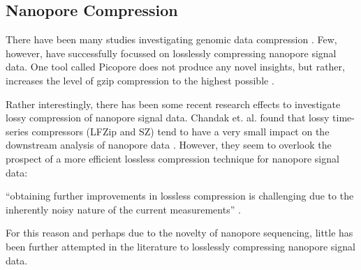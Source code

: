 \subsection{Nanopore Compression}

There have been many studies investigating genomic data compression
\cite{genomic-comp}. Few, however, have successfully focussed on losslessly
compressing nanopore signal data. One tool called Picopore does not produce any
novel insights, but rather, increases the level of gzip compression to the
highest possible \cite{picopore}.

Rather interestingly, there has been some recent research effects to investigate
lossy compression of nanopore signal data. Chandak et. al. found that lossy
time-series compressors (LFZip and SZ) tend to have a very small impact on the
downstream analysis of nanopore data \cite{lossy-nano, lfzip}.
However, they seem to overlook the prospect of a more efficient lossless
compression technique for nanopore signal data:
\begin{displayquote}
``obtaining further improvements in lossless compression is challenging due to the inherently noisy nature of the current measurements'' \cite{lossy-nano}.
\end{displayquote}
For this reason and perhaps due to the novelty of nanopore sequencing, little
has been further attempted in the literature to losslessly compressing nanopore
signal data.

